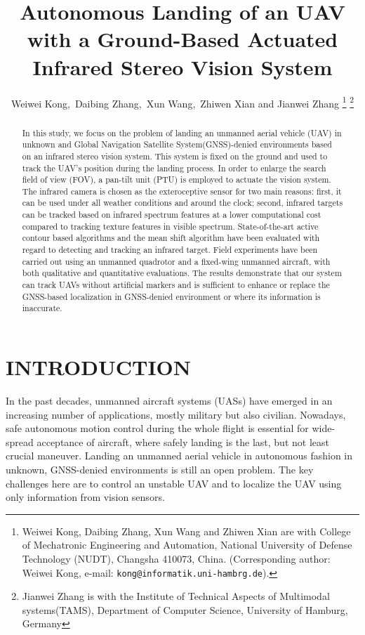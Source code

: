 \documentclass[letterpaper, 10 pt, conference]{ieeeconf}  %
\title{\LARGE \bf
Autonomous Landing of an UAV with a Ground-Based Actuated Infrared Stereo Vision System}
\author{Weiwei Kong,\ Daibing Zhang,\ Xun Wang,\ Zhiwen Xian and Jianwei Zhang%
\thanks{Weiwei Kong, Daibing Zhang, Xun Wang and Zhiwen Xian are with College of Mechatronic Engineering and Automation, National University of Defense Technology (NUDT), Changsha 410073, China. (Corresponding author: Weiwei Kong, e-mail:  {\tt\small kong@informatik.uni-hambrg.de}).
       }%
\thanks{Jianwei Zhang is with the Institute of Technical Aspects of Multimodal systems(TAMS), Department of Computer Science, University of Hamburg, Germany}%
}
\begin{document}
\maketitle
\thispagestyle{empty}
\pagestyle{empty}

\begin{abstract}

In this study, we focus on the problem of landing an unmanned aerial vehicle (UAV) in unknown and Global Navigation Satellite System(GNSS)-denied environments based on an infrared stereo vision system. This system is fixed on the ground and used to track the UAV's position during the landing process. In order to enlarge the search field of view (FOV), a pan-tilt unit (PTU) is employed to actuate the vision system. The infrared camera is chosen as the exteroceptive sensor for two main reasons: first, it can be used under all weather conditions and around the clock; second, infrared targets can be tracked based on infrared spectrum features at a lower computational cost compared to tracking texture features in visible spectrum. State-of-the-art active contour based algorithms and the mean shift algorithm have been evaluated with regard to detecting and tracking an infrared target. Field experiments have been carried out using an unmanned quadrotor and a fixed-wing unmanned aircraft, with both qualitative and quantitative evaluations. The results demonstrate that our system can track UAVs without artificial markers and is sufficient to enhance or replace the GNSS-based localization in GNSS-denied environment or where its information is inaccurate.

\end{abstract}


\section{INTRODUCTION}

In the past decades, unmanned aircraft systems (UASs) have emerged in an increasing number of applications, mostly military but also civilian. Nowadays, safe autonomous motion control during the whole flight is essential for wide-spread acceptance of aircraft, where safely landing is the last, but not least crucial maneuver. Landing an unmanned aerial vehicle in autonomous fashion in unknown, GNSS-denied environments is still an open problem. The key challenges here are to control an unstable UAV and to localize the UAV using only information from vision sensors.
\end{document}
